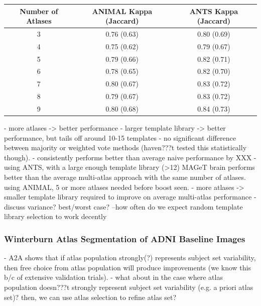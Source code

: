\documentclass{article}\usepackage{graphicx, color}
\newcommand{\marginnote}[1]{\-\marginpar[\raggedleft\footnotesize #1]{\raggedright\footnotesize #1}}
\newcommand{\todo}[1]{\marginnote{\textcolor{red}{TODO #1}}}
\begin{document}
\begin{table}
    \begin{tabular}{c|c|c}
        Number of Atlases & ANIMAL Kappa (Jaccard) & ANTS Kappa (Jaccard) \\ \hline
        3                 & 0.76 (0.63)             & 0.80 (0.69)          \\ 
        4                 & 0.75 (0.62)             & 0.79 (0.67)          \\ 
        5                 & 0.79 (0.66)             & 0.82 (0.71)          \\ 
        6                 & 0.78 (0.65)             & 0.82 (0.70)          \\ 
        7                 & 0.80 (0.67)             & 0.83 (0.72)          \\ 
        8                 & 0.79 (0.67)             & 0.83 (0.72)          \\ 
        9                 & 0.80 (0.68)             & 0.84 (0.73)          \\
    \end{tabular}
\end{table}

- more atlases -> better performance
- larger template library -> better performance, but tails off around 10-15 templates
- no significant difference between majority or weighted vote methods (haven???t tested this statistically though). 
- consistently performs better than average naive performance by XXX
- using ANTS, with a large enough template library (>12) MAGeT brain performs
  better than the average multi-atlas approach with the same number of atlases.
  using ANIMAL, 5 or more atlases needed before boost seen. 
- more atlases -> smaller template library required to improve on average multi-atlas performance
- discuss variance?  best/worst case? --how often do we expect random template library selection to work decently

\todo{cost (in registrations) / benefit trade off graph:  show number of registrations per Kappa?  or hours of manual labour per Kappa?)}

\subsubsection{Winterburn Atlas Segmentation of ADNI Baseline Images}

- A2A shows that if atlas population strongly(?) represents subject set
  variability, then free choice from atlas population will produce improvements
(we know this b/c of extensive validation trials). 
- what about in the case where atlas population doesn???t strongly represent
  subject set variability (e.g. a priori atlas set)?  then, we can use atlas
selection to refine atlas set? 
\end{document}
